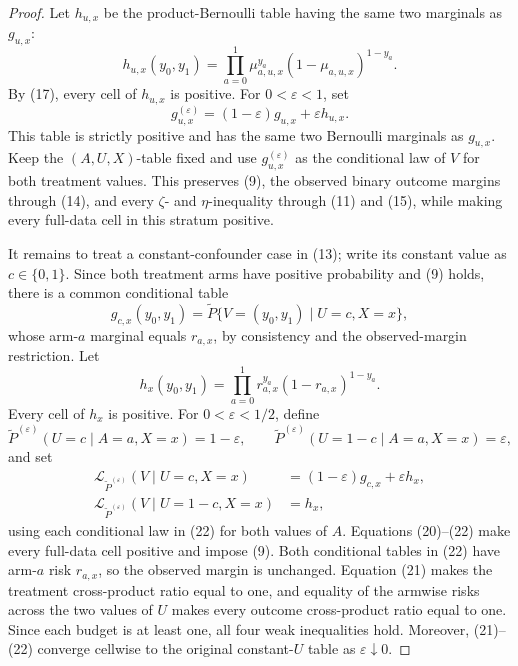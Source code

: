 \documentclass{article}
\begin{document}
\begin{proof}
Let \(h_{u,x}\) be the product-Bernoulli table having the same two marginals as \(g_{u,x}\):
\[
h_{u,x}(y_0,y_1)
=\prod_{a=0}^1
 \mu_{a,u,x}^{y_a}(1-\mu_{a,u,x})^{1-y_a}.               \tag{18}
\]
By (17), every cell of \(h_{u,x}\) is positive.  For \(0<\varepsilon<1\), set
\[
g_{u,x}^{(\varepsilon)}
=(1-\varepsilon)g_{u,x}+\varepsilon h_{u,x}.             \tag{19}
\]
This table is strictly positive and has the same two Bernoulli marginals as \(g_{u,x}\).  Keep the \((A,U,X)\)-table fixed and use \(g_{u,x}^{(\varepsilon)}\) as the conditional law of \(V\) for both treatment values.  This preserves (9), the observed binary outcome margins through (14), and every \(\zeta\)- and \(\eta\)-inequality through (11) and (15), while making every full-data cell in this stratum positive.

It remains to treat a constant-confounder case in (13); write its constant value as \(c\in\{0,1\}\).  Since both treatment arms have positive probability and (9) holds, there is a common conditional table
\[
g_{c,x}(y_0,y_1)
=\widetilde P\{V=(y_0,y_1)\mid U=c,X=x\},
\]
whose arm-\(a\) marginal equals \(r_{a,x}\), by consistency and the observed-margin restriction.  Let
\[
h_x(y_0,y_1)
=\prod_{a=0}^1 r_{a,x}^{y_a}(1-r_{a,x})^{1-y_a}.          \tag{20}
\]
Every cell of \(h_x\) is positive.  For \(0<\varepsilon<1/2\), define
\[
\widetilde P^{(\varepsilon)}(U=c\mid A=a,X=x)=1-\varepsilon,
\qquad
\widetilde P^{(\varepsilon)}(U=1-c\mid A=a,X=x)=\varepsilon, \tag{21}
\]
and set
\[
\begin{aligned}
\mathcal L_{\widetilde P^{(\varepsilon)}}(V\mid U=c,X=x)
&=(1-\varepsilon)g_{c,x}+\varepsilon h_x,\\
\mathcal L_{\widetilde P^{(\varepsilon)}}(V\mid U=1-c,X=x)
&=h_x,
\end{aligned}                                             \tag{22}
\]
using each conditional law in (22) for both values of \(A\).  Equations (20)--(22) make every full-data cell positive and impose (9).  Both conditional tables in (22) have arm-\(a\) risk \(r_{a,x}\), so the observed margin is unchanged.  Equation (21) makes the treatment cross-product ratio equal to one, and equality of the armwise risks across the two values of \(U\) makes every outcome cross-product ratio equal to one.  Since each budget is at least one, all four weak inequalities hold.  Moreover, (21)--(22) converge cellwise to the original constant-\(U\) table as \(\varepsilon\downarrow0\).


\end{proof}
\end{document}
